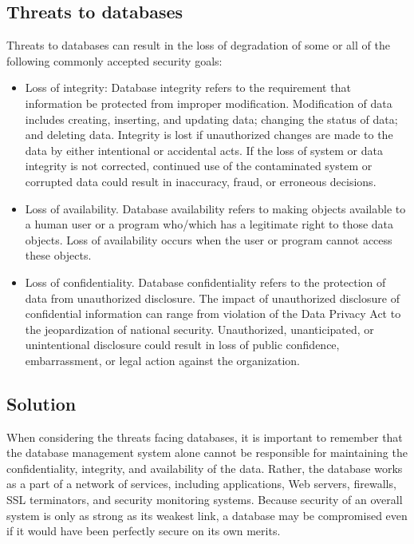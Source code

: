 \documentclass[a4paper]{article}
\numberwithin{equation}{section}
\begin{document}
\subsection{Threats to databases}
Threats to databases can result in the loss of degradation of some or all of the following commonly accepted security goals:
\begin{itemize}
  \item  Loss of integrity: Database integrity refers to the requirement that information be protected from improper modification.
        Modification of data includes creating, inserting, and updating data; changing the status of data; and deleting data.
        Integrity is lost if unauthorized changes are made to the data by either intentional or accidental acts.
        If the loss of system or data integrity is not corrected, continued use of the contaminated system or corrupted data could result in inaccuracy, fraud, or erroneous decisions.
  \item Loss of availability.
        Database availability refers to making objects available to a human user or a program who/which has a legitimate right to those data objects.
        Loss of availability occurs when the user or program cannot access these objects.
  \item Loss of confidentiality.
        Database confidentiality refers to the protection of data from unauthorized disclosure.
        The impact of unauthorized disclosure of confidential information can range from violation of the Data Privacy Act to the jeopardization of national security.
        Unauthorized, unanticipated, or unintentional disclosure could result in loss of public confidence, embarrassment, or legal action against the organization.

\end{itemize}

\subsection{Solution}
When considering the threats facing databases, it is important to remember that the database management system alone cannot be responsible for maintaining the confidentiality, integrity, and availability of the data.
Rather, the database works as a part of a network of services, including applications, Web servers, firewalls, SSL terminators, and security monitoring systems.
Because security of an overall system is only as strong as its weakest link, a database may be compromised even if it would have been perfectly secure on its own merits.
\end{document}
